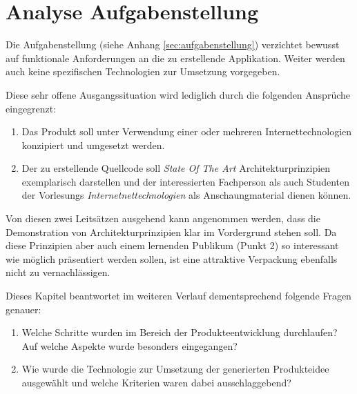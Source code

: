 \chapter{Analyse Aufgabenstellung}

Die Aufgabenstellung (siehe Anhang \ref{sec:aufgabenstellung}) verzichtet bewusst auf funktionale Anforderungen an die zu erstellende Applikation. Weiter werden auch keine spezifischen Technologien zur Umsetzung vorgegeben.

Diese sehr offene Ausgangssituation wird lediglich durch die folgenden Ansprüche eingegrenzt:

\begin{enumerate}
	\item Das Produkt soll unter Verwendung einer oder mehreren Internettechnologien konzipiert und umgesetzt werden.
	\item Der zu erstellende Quellcode soll \emph{State Of The Art} Architekturprinzipien \cite{ROCA} exemplarisch darstellen und der interessierten Fachperson als auch Studenten der Vorlesungs \emph{Internetnettechnologien} als Anschaungmaterial dienen können.
\end{enumerate}

Von diesen zwei Leitsätzen ausgehend kann angenommen werden, dass die Demonstration von Architekturprinzipien klar im Vordergrund stehen soll. Da diese Prinzipien aber auch einem lernenden Publikum (Punkt 2) so interessant wie möglich präsentiert werden sollen, ist eine attraktive Verpackung ebenfalls nicht zu vernachlässigen.

Dieses Kapitel beantwortet im weiteren Verlauf dementsprechend folgende Fragen genauer:

\begin{enumerate}
	\item Welche Schritte wurden im Bereich der Produkteentwicklung durchlaufen? Auf welche Aspekte wurde besonders eingegangen?
	\item Wie wurde die Technologie zur Umsetzung der generierten Produkteidee ausgewählt und welche Kriterien waren dabei ausschlaggebend?
\end{enumerate}



